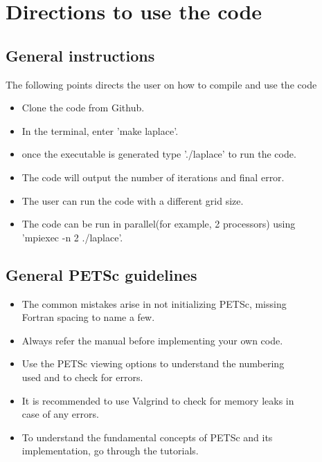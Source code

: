 \chapter{Directions to use the code}
\section{General instructions}
The following points directs the user on how to compile and use the code
\\

\begin{itemize}
  \item Clone the code from Github.
  \item In the terminal, enter 'make laplace'.
  \item once the executable is generated type './laplace' to run the code.
  \item The code will output the number of iterations and final error.
  \item The user can run the code with a different grid size.
  \item The code can be run in parallel(for example, 2 processors) using\\ 'mpiexec -n 2 ./laplace'. 
\end{itemize}

\section{General PETSc guidelines}

\begin{itemize}
  \item The common mistakes arise in not initializing PETSc, missing \\Fortran spacing to name a few.
  \item Always refer the manual before implementing your own code.
  \item Use the PETSc viewing options to understand the numbering \\used and to check for errors.
  \item It is recommended to use Valgrind to check for memory leaks in \\case of any errors.
  \item To understand the fundamental concepts of PETSc and its\\ implementation, go through the tutorials.
  
  
\end{itemize}

